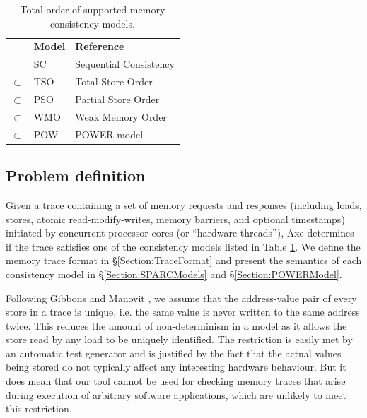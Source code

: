 \documentclass[11pt]{article}
\begin{document}
\begin{table}
\renewcommand{\arraystretch}{1.5}
\begin{center}
\begin{tabular}{lll}
          & \textbf{Model}  & \textbf{Reference} \\
          & SC     & Sequential Consistency \cite{SC} \\
$\subset$ & TSO    & Total Store Order \cite{SPARC} \\
$\subset$ & PSO    & Partial Store Order \cite{SPARC} \\
$\subset$ & WMO\footnotemark[2]
                   & Weak Memory Order \cite{SPARC} \\
$\subset$ & POW    & POWER model \cite{POWER} \\
\end{tabular}
\end{center}
\caption{Total order of supported memory consistency models.}
\label{Table:Models}
\end{table}


\subsection{Problem definition}
\label{Section:ProbDef}

Given a trace containing a set of memory requests and responses
(including loads, stores, atomic read-modify-writes, memory barriers,
and optional timestamps) initiated by concurrent processor cores (or
``hardware threads''), Axe determines if the trace satisfies one of
the consistency models listed in Table \ref{Table:Models}.  We define
the memory trace format in \S\ref{Section:TraceFormat} and present
the semantics of each consistency model in
\S\ref{Section:SPARCModels} and \S\ref{Section:POWERModel}.

Following Gibbons \cite{Gibbons} and Manovit \cite{Manovit}, we assume
that the address-value pair of every store in a trace is unique, i.e.
the same value is never written to the same address twice.  This
reduces the amount of non-determinism in a model as it allows the
store read by any load to be uniquely identified. The restriction is
easily met by an automatic test generator and is justified by the
fact that the actual values being stored do not typically affect any
interesting hardware behaviour.  But it does mean that our tool cannot
be used for checking memory traces that arise during execution of
arbitrary software applications, which are unlikely to meet this
restriction.
\end{document}
